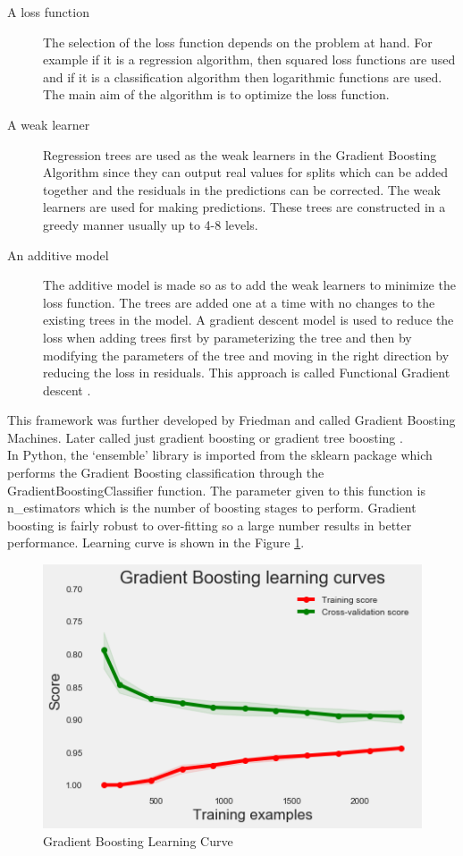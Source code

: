 \begin{description}
\item[A loss function] The selection of the loss function depends on the problem at hand. For example if it is a regression algorithm, then squared loss functions are used and if it is a classification algorithm then logarithmic functions are used. The main aim of the algorithm is to optimize the loss function.
\item[A weak learner] Regression trees are used as the weak learners in the Gradient Boosting Algorithm since they can output real values for splits which can be added together and the residuals in the predictions can be corrected. The weak learners are used for making predictions. These trees are constructed in a greedy manner usually up to 4-8 levels.
\item[An additive model] The additive model is made so as to add the weak learners to minimize the loss function. The trees are added one at a time with no changes to the existing trees in the model. A gradient descent model is used to reduce the loss when adding trees first by parameterizing the tree and then by modifying the parameters of the tree and moving in the right direction by reducing the loss in residuals. This approach is called Functional Gradient descent \cite{link15}.
\end{description}

This framework was further developed by Friedman and called Gradient Boosting Machines. Later called just gradient boosting or gradient tree boosting \cite{link15}.\\
In Python, the `ensemble' library is imported from the sklearn package which performs the Gradient Boosting classification through the GradientBoostingClassifier function. The parameter given to this function is n\_estimators which is the number of boosting stages to perform. Gradient boosting is fairly robust to over-fitting so a large number results in better performance. Learning curve is shown in the Figure \ref{5.4}.

\begin{figure}
\caption{Gradient Boosting Learning Curve}
\label{5.4}
\centering
\includegraphics[width=\columnwidth]{images/5_4.png}
\end{figure}

